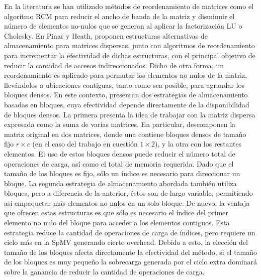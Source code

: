 En la literatura se han utilizado métodos de reordenamiento de matrices como el algoritmo RCM para reducir el ancho de banda de la matriz y disminuir el número de elementos no-nulos que se generan al aplicar la factorización LU o Cholesky. En \cite{Pinar1999} Pinar y Heath, proponen estructuras alternativas de almacenamiento para matrices dispersas, junto con algoritmos de reordenamiento para incrementar la efectividad de dichas estructuras, con el principal objetivo de reducir la cantidad de accesos indireccionados. Dicho de otra forma, un reordenamiento es aplicado para permutar los elementos no nulos de la matriz, llevándolos a ubicaciones contiguas, tanto como sea posible, para agrandar los bloques densos. 
En este contexto, presentan dos estrategias de almacenamiento basadas en bloques, cuya efectividad depende directamente de la disponibilidad de bloques densos. La primera presenta la idea de trabajar con la matriz dispersa expresada como la suma de varias matrices. En particular, descomponen la matriz original en dos matrices, donde una contiene bloques densos de tamaño fijo $r \times c$ (en el caso del trabajo en cuestión $1\times 2$), y la otra con los restantes elementos. El uso de estos bloques densos puede reducir el número total de operaciones de carga, así como el total de memoria requerida. Dado que el tamaño de los bloques es fijo, sólo un índice es necesario para direccionar un bloque. La segunda estrategia de almacenamiento abordada también utiliza bloques, pero a diferencia de la anterior, éstos son de largo variable, permitiendo así empaquetar más elementos no nulos en un solo bloque. De nuevo, la ventaja que ofrecen estas estructuras es que sólo es necesario el índice del primer elemento no nulo del bloque para acceder a los elementos contiguos. %
Esta estrategia reduce la cantidad de operaciones de carga de índices, pero requiere un ciclo más en la SpMV generando cierto overhead. Debido a esto, la elección del tamaño de los bloques afecta directamente la efectividad del método, si el tamaño de los bloques es muy pequeño la sobrecarga generada por el ciclo extra dominará sobre la ganancia de reducir la cantidad de operaciones de carga.

